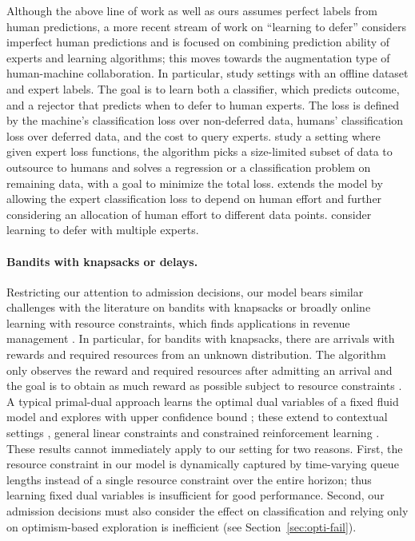 Although the above line of work as well as ours assumes perfect labels from human predictions, a more recent stream of work on ``learning to defer'' considers imperfect human predictions and is focused on combining prediction ability of experts and learning algorithms; this moves towards the augmentation type of human-machine collaboration. In particular, \cite{MadrasCPZ18, MozannarS20,wilder2020learning,CharusaieMSS22} study settings with an offline dataset and expert labels. The goal is to learn both a classifier, which predicts outcome, and a rejector that predicts when to defer to human experts. The loss is defined by the machine's classification loss over non-deferred data, humans' classification loss over deferred data, and the cost to query experts. \cite{DeKGG20,DeOZR21} study a setting where given expert loss functions, the algorithm picks a size-limited subset of data to outsource to humans and solves a regression or a classification problem on remaining data, with a goal to minimize the total loss. \cite{raghu2019algorithmic} extends the model by allowing the expert classification loss to depend on human effort and further considering an allocation of human effort to different data points. \cite{KeswaniLK21,VermaBN23,mao2023principled} consider learning to defer with multiple experts. 

\paragraph{Bandits with knapsacks or delays.} Restricting our attention to admission decisions, our model bears similar challenges with the literature on bandits with knapsacks or broadly online learning with resource constraints, which finds applications in revenue management \citep{besbes2012blind,wang2014close,ferreira2018online}. In particular, for bandits with knapsacks, there are arrivals with rewards and required resources from an unknown distribution. The algorithm only observes the reward and required resources after admitting an arrival and the goal is to obtain as much reward as possible subject to resource constraints \citep{badanidiyuru2018bandits,agrawal2019bandits}. A typical primal-dual approach learns the optimal dual variables of a fixed fluid model and explores with upper confidence bound \citep{badanidiyuru2014resourceful,LiSY21}; these extend to contextual settings \citep{WuSLJ15,AgrawalD16,AgrawalDL16, SlivkinsSF23}, general linear constraints \citep{PacchianoGBJ21, LiuLSY21} and constrained reinforcement learning \citep{BrantleyDLMSSS20,Cheung19}. These results cannot immediately apply to our setting for two reasons. First, the resource constraint in our model is dynamically captured by time-varying queue lengths instead of a single resource constraint over the entire horizon; thus learning fixed dual variables is insufficient for good performance. Second, our admission decisions must also consider the effect on classification and relying only on optimism-based exploration is inefficient (see Section~\ref{sec:opti-fail}).

